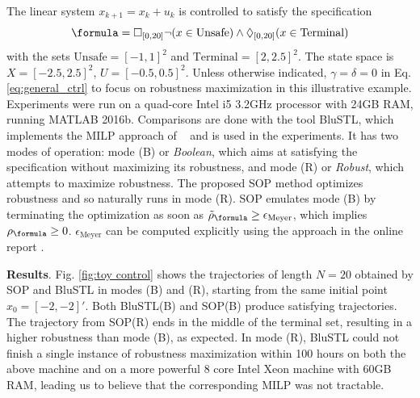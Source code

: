 \begin{exmp}
\label{ex:toyproblem}
The linear system $x_{k+1} = x_k + u_k$ is controlled
to satisfy the specification
\[\formula = \always_{[0,20]} \neg (x \in \text{Unsafe}) \land \eventually_{[0,20]} (x \in \text{Terminal})\]
with the sets $\text{Unsafe}=[-1,1]^2$ and $\text{Terminal}=[2,2.5]^2$. 
The state space is $X=[-2.5,2.5]^2$, $U=[-0.5,0.5]^2$.
Unless otherwise indicated, $\gamma=\delta=0$ in Eq. \eqref{eq:general_ctrl} to focus on robustness maximization in this illustrative example. 
Experiments were run on a quad-core Intel i5 3.2GHz processor with 24GB RAM, running MATLAB 2016b. Comparisons are done with the tool BluSTL, which implements the MILP approach of ~\cite{Raman14_MPCSTL} and is used in the experiments.
It has two modes of operation: mode (B) or \textit{Boolean}, which aims at satisfying the specification without maximizing its robustness, and mode (R) or \textit{Robust}, which attempts to maximize robustness. 
The proposed SOP method optimizes robustness and so naturally runs in mode (R).
SOP emulates mode (B) by terminating the optimization as soon as $\srobf \geq \epsilon_{\text{Meyer}}$, which implies $\rob_{\formula} \geq 0$. $\epsilon_{\text{Meyer}}$ can be computed explicitly using the approach in the online report \cite{PantAM17_SmoothOpTechRpt}.


\textbf{Results}.
Fig. \ref{fig:toy control} shows the trajectories of length $N=20$ obtained by SOP and BluSTL in modes (B) and (R), starting from the same initial point $x_0=[-2,-2]'$.
Both BluSTL(B) and SOP(B) produce satisfying trajectories. 
The trajectory from SOP(R) ends in the middle of the terminal set, resulting in a higher robustness than mode (B), as expected. 
In mode (R), BluSTL could not finish a single instance of robustness maximization within 100 hours on both the above machine and on a more powerful 8 core Intel Xeon machine with 60GB RAM, leading us to believe that the corresponding MILP was not tractable.
 

\end{exmp}
